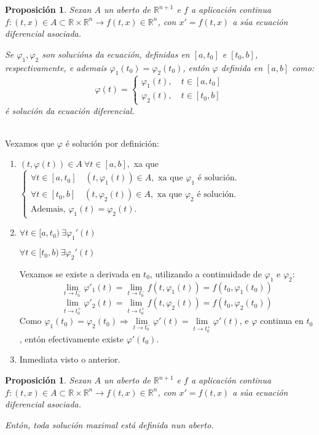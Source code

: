 \documentclass[11pt, a4paper,twoside]{article}
\makeatletter
\theoremstyle{theorem-style}  %
\newtheorem{proposition}[theorem]{Proposición}
\renewenvironment{proof}[1][\proofname]{\par
	\pushQED{\qed}%
	\normalfont \topsep6\p@\@plus6\p@\relax
	\list{}{%
		\settowidth{\leftmargin}{\quad:\hskip\labelsep}%
		\setlength{\labelwidth}{0pt}%
		\setlength{\itemindent}{-\leftmargin}%
	}%
	\item[\hskip\labelsep\itshape#1\@addpunct{:}]\ignorespaces
}{%
	\popQED\endlist\@endpefalse
}
\theoremstyle{definition-style}
\theoremstyle{example-style}
\makeatother
\begin{document}
\begin{proposition}
	Sexan $ A $ un aberto de $ \mathbb{R}^{n+1} $ e $ f $ a aplicación continua $ f:(t,x)\in A\subset \mathbb{R}\times \mathbb{R}^n \longrightarrow f(t,x)\in \mathbb{R}^n $, con $  x'=f(t,x) $ a súa ecuación diferencial asociada. 
	
	Se $ \varphi_1, \varphi_2 $ son solucións da ecuación, definidas en $ [a, t_0]$ e $ [t_0,b] $, respectivamente, e ademais $ \varphi_1(t_0)=\varphi_2(t_0) $, entón $ \varphi $ definida en $ [a,b] $ como:
	\[ \varphi(t)=\begin{cases}
	\varphi_1(t), \quad t\in [a,t_0]\\
	\varphi_2(t), \quad t\in [t_0,b]
	\end{cases} \]
	é solución da ecuación diferencial.
\end{proposition}
\begin{proof}\ \\
	Vexamos que $ \varphi $ é solución por definición:
	\begin{enumerate}[\quad i)]
		\item $ (t,\varphi(t))\in A \ \forall t \in [a,b], $ xa que $ \begin{cases}
		\forall t\in [a,t_0] \quad (t, \varphi_1(t)) \in A, \text{ xa que }\varphi_1 \text{ é solución.}\\
		\forall t\in [t_0,b] \quad (t, \varphi_2(t)) \in A, \text{ xa que }\varphi_2 \text{ é solución.}\\
		\text{Ademais, } \varphi_1(t)=\varphi_2(t).
		\end{cases}$
		\item $ \forall t \in [a,t_0) \ \exists \varphi_1'(t)$
		
		$ \forall t \in [t_0,b) \ \exists \varphi_2'(t) $
		
		Vexamos se existe a derivada en $ t_0 $, utilizando a continuidade de $ \varphi_1 $ e $ \varphi_2 $:
		\[ \lim\limits_{t \to t_0^-} \varphi'_1(t)=\lim\limits_{t \to t_0^-} f(t, \varphi_1(t))=f(t_0,\varphi_1(t_0)) \]
		\[ \lim\limits_{t \to t_0^+} \varphi'_2(t)=\lim\limits_{t \to t_0^+} f(t, \varphi_2(t))=f(t_0,\varphi_2(t_0)) \]
		Como $ \varphi_1(t_0)=\varphi_2(t_0) \Rightarrow \lim\limits_{t \to t_0^-} \varphi'(t)=\lim\limits_{t \to t_0^+} \varphi'(t)$, e $\varphi $ continua en $ t_0 $, entón efectivamente existe $ \varphi'(t_0) $.
		\item Inmediata visto o anterior.
	\end{enumerate} 
\end{proof}
\begin{proposition}
	Sexan $ A $ un aberto de $ \mathbb{R}^{n+1} $ e $ f $ a aplicación continua $ f:(t,x)\in A\subset \mathbb{R}\times \mathbb{R}^n \longrightarrow f(t,x)\in \mathbb{R}^n $, con $  x'=f(t,x) $ a súa ecuación diferencial asociada. 
	
	Entón, toda solución maximal está definida nun aberto.
\end{proposition}
\end{document}
